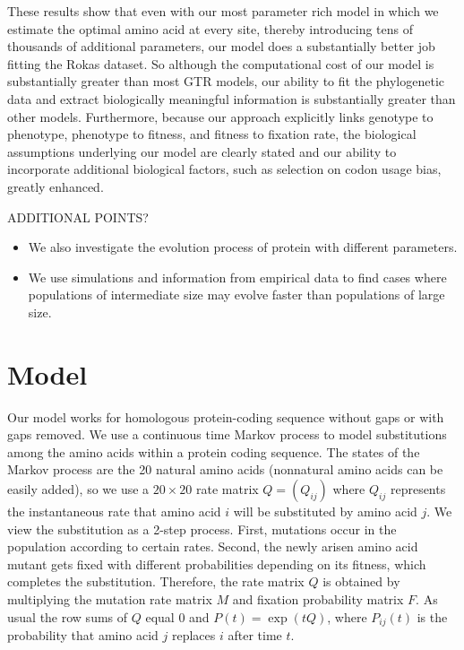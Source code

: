 \documentclass[13pt]{article}
\begin{document}
These results show that even with our most parameter rich model in which we estimate the optimal amino acid at every site, thereby introducing tens of thousands of additional parameters, our model does a substantially better job fitting the Rokas dataset.
So although the computational cost of our model is substantially greater than most GTR models,  our ability to fit the phylogenetic data and extract biologically meaningful information is substantially greater than other models.
Furthermore, because our approach explicitly links genotype to phenotype, phenotype to fitness, and fitness to fixation rate, the biological assumptions underlying our model are clearly stated and our ability to incorporate additional biological factors, such as selection on codon usage bias, greatly enhanced.
 
ADDITIONAL POINTS?
\begin{itemize}
\item We also investigate the evolution process of protein with different parameters.
\item We use simulations and information from empirical data to find cases where populations of intermediate size may evolve faster than populations of large size.
\end{itemize}


\section{Model}
Our model works for homologous protein-coding sequence without gaps or with gaps removed.
We use a continuous time Markov process to model substitutions among the amino acids within a protein coding sequence.
The states of the Markov process are the 20 natural amino acids (nonnatural amino acids can be easily added), so we use a $20 \times 20$ rate matrix $Q=(Q_{ij})$ where $Q_{ij}$ represents the instantaneous rate that amino acid $i$ will be substituted by amino acid $j$.
We view the substitution as a 2-step process.
First, mutations occur in the population according to certain rates.
Second, the newly arisen amino acid mutant gets fixed with different probabilities depending on its fitness, which completes the substitution.
Therefore, the rate matrix $Q$ is obtained by multiplying the mutation rate matrix $M$ and fixation probability matrix $F$.
As usual the row sums of $Q$ equal $0$ and $P(t) = \exp (tQ)$, where $P_{ij}(t)$ is the probability that amino acid $j$ replaces $i$ after time $t$.\\
\end{document}
